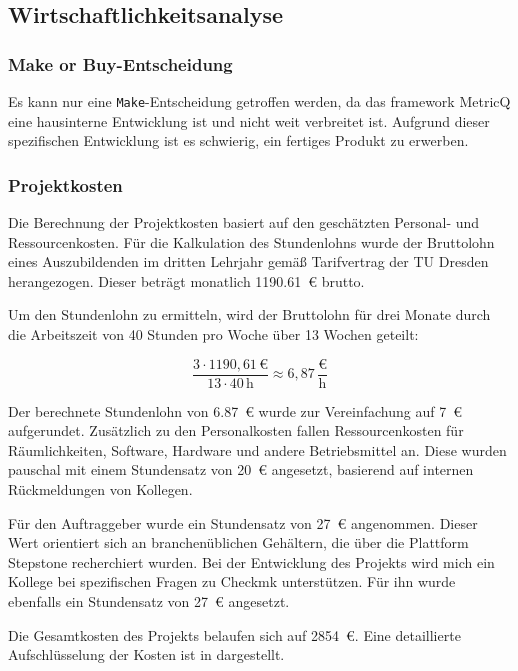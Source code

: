 \subsection{Wirtschaftlichkeitsanalyse}

\subsubsection{Make or Buy-Entscheidung}
Es kann nur eine \texttt{Make}-Entscheidung getroffen werden, da das \Gls{framework} \Gls{MetricQ} eine hausinterne Entwicklung ist und nicht weit verbreitet ist.
Aufgrund dieser spezifischen Entwicklung ist es schwierig, ein fertiges Produkt zu erwerben.

\subsubsection{Projektkosten}
Die Berechnung der Projektkosten basiert auf den geschätzten Personal- und Ressourcenkosten.
Für die Kalkulation des Stundenlohns wurde der Bruttolohn eines Auszubildenden im dritten Lehrjahr gemäß Tarifvertrag der \acrshort{TU} Dresden herangezogen.
Dieser beträgt monatlich \qty{1190.61}{\euro} brutto\cite{TU_Dresden_Arbeiten}.

\noindent
Um den Stundenlohn zu ermitteln, wird der Bruttolohn für drei Monate durch die Arbeitszeit von 40 Stunden pro Woche über 13 Wochen geteilt:

\[
  \frac{3 \cdot 1190,61 \, \text{€}}{13 \cdot 40 \, \text{h}} \approx 6,87 \, \frac{\text{€}}{\text{h}}
\]

\noindent
Der berechnete Stundenlohn von \qty{6,87}{\euro} wurde zur Vereinfachung auf \qty{7}{\euro} aufgerundet.
Zusätzlich zu den Personalkosten fallen Ressourcenkosten für Räumlichkeiten, Software, Hardware und andere Betriebsmittel an.
Diese wurden pauschal mit einem Stundensatz von \qty{20}{\euro} angesetzt, basierend auf internen Rückmeldungen von Kollegen.

\noindent
Für den Auftraggeber wurde ein Stundensatz von \qty{27}{\euro} angenommen.
Dieser Wert orientiert sich an branchenüblichen Gehältern, die über die Plattform Stepstone\cite{informatiker-gehalt-lit} recherchiert wurden.
Bei der Entwicklung des Projekts wird mich ein Kollege bei spezifischen Fragen zu \Gls{Checkmk} unterstützen.
Für ihn wurde ebenfalls ein Stundensatz von \qty{27}{\euro} angesetzt.

\noindent
Die Gesamtkosten des Projekts belaufen sich auf \qty{2854}{\euro}.
Eine detaillierte Aufschlüsselung der Kosten ist in  dargestellt.

